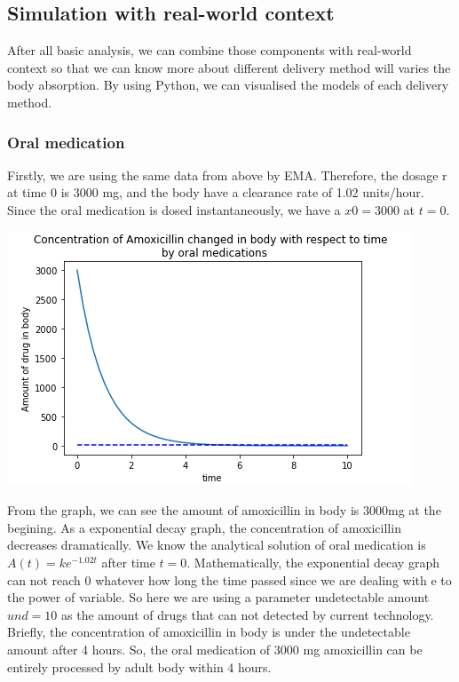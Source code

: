 \documentclass{article}
\begin{document}
\subsection*{Simulation with real-world context}
After all basic analysis, we can combine those components with real-world context so that we can know more about different delivery method will varies the body absorption. By using Python, we can visualised the models of each delivery method. 
\subsubsection*{Oral medication}
Firstly, we are using the same data from above by EMA. Therefore, the dosage r at time 0 is 3000 mg, and the body have a clearance rate of 1.02 units/hour. Since the oral medication is dosed instantaneously, we have a $x0 = 3000$ at $t = 0$. \\
\begin{center}
    \includegraphics[scale = 0.7]{simuOral.png}
\end{center}
From the graph, we can see the amount of amoxicillin in body is 3000mg at the begining. As a exponential decay graph, the concentration of amoxicillin decreases dramatically. We know the analytical solution of oral medication is $A(t) = ke^{-1.02t}$ after time $t = 0$. Mathematically, the exponential decay graph can not reach 0 whatever how long the time passed since we are dealing with e to the power of variable. So here we are using a parameter undetectable amount $und = 10$ as the amount of drugs that can not detected by current technology. Briefly, the concentration of amoxicillin in body is under the undetectable amount after 4 hours. So, the oral medication of 3000 mg amoxicillin can be entirely processed by adult body within 4 hours.\\
\end{document}
